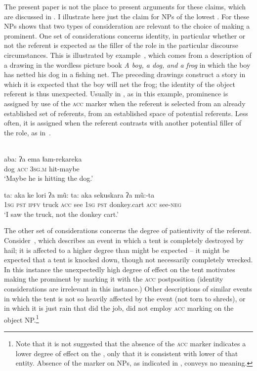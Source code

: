 \documentclass[output=paper]{LSP/langsci}
\begin{document}
\newpage 
The present paper is not the place to present arguments for these claims, which are discussed in \citet{McGregor2015Optional}. I illustrate here just the claim for NPs of the lowest . For these NPs \citet{McGregor2015Optional} shows that two types of consideration are relevant to the choice of making a  prominent. One set of considerations concerns identity, in particular whether or not the referent is expected as the filler of the  role in the particular discourse circumstances. This is illustrated by example~, which comes from a description of a drawing in the wordless picture book \textit{A boy, a dog, and a frog} \citep{Mayer1967Boy} in which the boy has netted his dog in a fishing net. The preceding drawings construct a story in which it is expected that the boy will net the frog; the identity of the object referent is thus unexpected. Usually in , as in this example, prominence is assigned by use of the \textsc{acc} marker when the  referent is selected from an already established set of referents, from an established space of potential referents. Less often, it is assigned when the  referent contrasts with another potential filler of the role, as in~.

\ea {}\\ 
\ea \label{09-mc-ex:21}
\gll aba: ʔa ema ǁam-rekareka\\
dog \textsc{acc} 3\textsc{sg.m} hit-maybe\\
\glt ‘Maybe he is hitting the dog.’

\ex \label{09-mc-ex:22}
\gll ta: aka ke lori ʔa mũ: ta: aka sekuskara ʔa mũ:-ta \\
1\textsc{sg} \textsc{pst} \textsc{ipfv} truck \textsc{acc} see 1\textsc{sg} \textsc{pst} donkey.cart \textsc{acc} see-\textsc{neg}\\
\glt ‘I saw the truck, not the donkey cart.’
\z
\z

The other set of considerations concerns the degree of patientivity of the  referent. Consider~, which describes an event in which a tent is completely destroyed by hail; it is affected to a higher degree than might be expected – it might be expected that a tent is knocked down, though not necessarily completely wrecked. In this instance the unexpectedly high degree of effect on the tent motivates making the  prominent by marking it with the \textsc{acc} postposition (identity considerations are irrelevant in this instance.) Other descriptions of similar events in which the tent is not so heavily affected by the event (not torn to shreds), or in which it is just rain that did the job, did not employ \textsc{acc} marking on the object NP.\footnote{Note that it is not suggested that the absence of the \textsc{acc} marker indicates a lower degree of effect on the , only that it is consistent with lower  of that entity. Absence of the marker on  NPs, as indicated in , conveys no meaning.}
\end{document}
